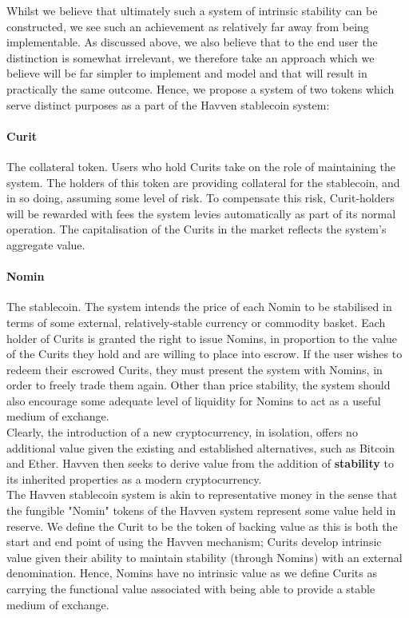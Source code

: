 \noindent Whilst we believe that ultimately such a system of intrinsic stability can be constructed, we see such an achievement as relatively far away from being implementable. As discussed above, we also believe that to the end user the distinction is somewhat irrelevant, we therefore take an approach which we believe will be far simpler to implement and model and that will result in practically the same outcome. Hence, we propose a system of two tokens which serve distinct purposes as a part of the Havven stablecoin system:

\paragraph{Curit} The collateral token. Users who hold Curits take on the role of maintaining the system. The holders of this token are providing collateral for the stablecoin, and in so doing, assuming some level of risk. To compensate this risk, Curit-holders will be rewarded with fees the system levies automatically as part of its normal operation. The capitalisation of the Curits in the market reflects the system's aggregate value.

\paragraph{Nomin} The stablecoin. The system intends the price of each Nomin to be stabilised in terms of some external, relatively-stable currency or commodity basket. Each holder of Curits is granted the right to issue Nomins, in proportion to the value of the Curits they hold and are willing to place into escrow. If the user wishes to redeem their escrowed Curits, they must present the system with Nomins, in order to freely trade them again. Other than price stability, the system should also encourage some adequate level of liquidity for Nomins to act as a useful medium of exchange. \\

\noindent Clearly, the introduction of a new cryptocurrency, in isolation, offers no additional value given the existing and established alternatives, such as Bitcoin and Ether. Havven then seeks to derive value from the addition of \textbf{stability} to its inherited properties as a modern cryptocurrency. \\

\noindent The Havven stablecoin system is akin to representative money in the sense that the fungible "Nomin" tokens of the Havven system represent some value held in reserve. We define the Curit to be the token of backing value as this is both the start and end point of using the Havven mechanism; Curits develop intrinsic value given their ability to maintain stability (through Nomins) with an external denomination. Hence, Nomins have no intrinsic value as we define Curits as carrying the functional value associated with being able to provide a stable medium of exchange. \\

